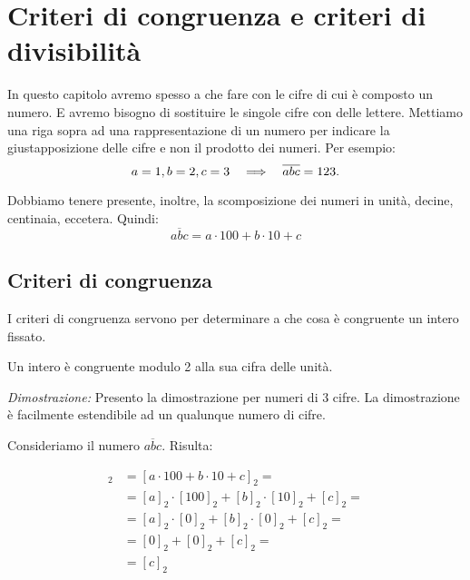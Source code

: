 \chapter{Criteri di congruenza e criteri di divisibilità}

In questo capitolo avremo spesso a che fare con le cifre di cui è composto un numero. E avremo bisogno di sostituire le singole cifre con delle lettere. Mettiamo una riga sopra ad una rappresentazione di un numero per indicare la giustapposizione delle cifre e non il prodotto dei numeri. Per esempio:
\begin{equation*}
    a=1, b=2, c=3  \quad\Longrightarrow\quad  \overline{abc} = 123.
\end{equation*}

Dobbiamo tenere presente, inoltre, la scomposizione dei numeri in unità, decine, centinaia, eccetera. Quindi:
\begin{equation*}
    \overline{abc} = a \cdot 100 + b \cdot 10 + c
\end{equation*}

\section{Criteri di congruenza}

I criteri di congruenza servono per determinare a che cosa è congruente un intero fissato.

    \begin{teorema}
        Un intero è congruente modulo 2 alla sua cifra delle unità.
    \end{teorema}
    \begin{dimostrazione}
        \emph{Dimostrazione:}
        Presento la dimostrazione per numeri di 3 cifre. La dimostrazione è facilmente estendibile ad un qualunque numero di cifre.

        Consideriamo il numero $\overline{abc}$. Risulta:

        \begin{align*}
            [\overline{abc}]_2 &= [a \cdot 100 + b \cdot 10 + c]_2 = \\
            &= [a]_2 \cdot [100]_2 + [b]_2 \cdot [10]_2 + [c]_2 = \\
            &= [a]_2 \cdot [0]_2 + [b]_2 \cdot [0]_2 + [c]_2 = \\
            &= [0]_2 + [0]_2 + [c]_2 = \\
            &= [c]_2
        \end{align*}
    \end{dimostrazione}

